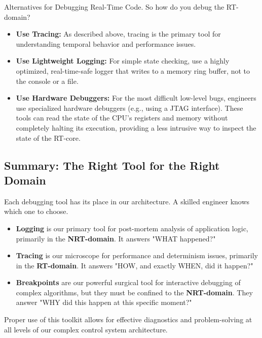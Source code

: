 \begin{tipbox}{Alternatives for Debugging Real-Time Code.}
    So how do you debug the RT-domain?
    \begin{itemize}
        \item \textbf{Use Tracing:} As described above, tracing is the primary tool for understanding temporal behavior and performance issues.
        \item \textbf{Use Lightweight Logging:} For simple state checking, use a highly optimized, real-time-safe logger that writes to a memory ring buffer, not to the console or a file.
        \item \textbf{Use Hardware Debuggers:} For the most difficult low-level bugs, engineers use specialized hardware debuggers (e.g., using a JTAG interface). These tools can read the state of the CPU's registers and memory without completely halting its execution, providing a less intrusive way to inspect the state of the RT-core.
    \end{itemize}
\end{tipbox}

\subsection{Summary: The Right Tool for the Right Domain}
\label{subsec:debugging_tool_summary}
Each debugging tool has its place in our architecture. A skilled engineer knows which one to choose.
\begin{itemize}
    \item \textbf{Logging} is our primary tool for post-mortem analysis of application logic, primarily in the \textbf{NRT-domain}. It answers "WHAT happened?"
    \item \textbf{Tracing} is our microscope for performance and determinism issues, primarily in the \textbf{RT-domain}. It answers "HOW, and exactly WHEN, did it happen?"
    \item \textbf{Breakpoints} are our powerful surgical tool for interactive debugging of complex algorithms, but they must be confined to the \textbf{NRT-domain}. They answer "WHY did this happen at this specific moment?"
\end{itemize}
Proper use of this toolkit allows for effective diagnostics and problem-solving at all levels of our complex control system architecture.




